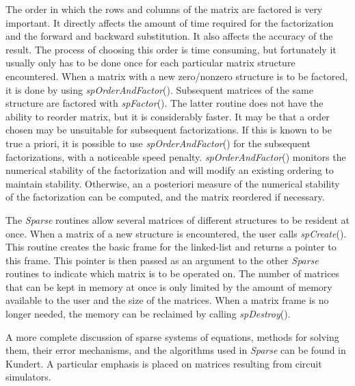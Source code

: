 \documentclass[11pt]{article}
\begin{document}
The order in which the rows and columns of the matrix are factored is
very important.  It directly affects the amount of time required for
the factorization and the forward and backward substitution.  It also
affects the accuracy of the result.  The process of choosing this order
is time consuming, but fortunately it usually only has to be done once
for each particular matrix structure encountered.  When a matrix with a
new zero/nonzero structure is to be factored, it is done by using
\emph{spOrderAndFactor}().  Subsequent matrices of the same structure are
factored with \emph{spFactor}().  The latter routine does not have the
ability to reorder matrix, but it is considerably faster.  It may be
that a order chosen may be unsuitable for subsequent factorizations.
If this is known to be true a priori, it is possible to use
\emph{spOrderAndFactor}() for the subsequent factorizations, with a
noticeable speed penalty.  \emph{spOrderAndFactor}() monitors the numerical
stability of the factorization and will modify an existing ordering to
maintain stability.  Otherwise, an a posteriori measure of the numerical
stability of the factorization can be computed, and the matrix
reordered if necessary.

The \emph{Sparse} routines allow several matrices of different
structures to be resident at once.  When a matrix of a new structure is
encountered, the user calls \emph{spCreate}().  This routine creates the
basic frame for the linked-list and returns a pointer to this frame.
This pointer is then passed as an argument to the other \emph{Sparse}
routines to indicate which matrix is to be operated on.  The number of
matrices that can be kept in memory at once is only limited by the
amount of memory available to the user and the size of the matrices.
When a matrix frame is no longer needed, the memory can be reclaimed by
calling \emph{spDestroy}().

A more complete discussion of sparse systems of equations, methods
for solving them, their error mechanisms, and the algorithms used in
\emph{Sparse} can be found in Kundert\cite{kundert86}.  A particular emphasis
is placed on matrices resulting from circuit simulators.
\end{document}
